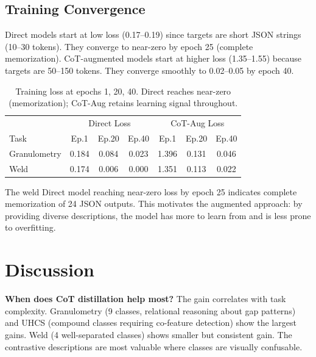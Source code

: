\documentclass[11pt]{article}
\begin{document}
\subsection{Training Convergence}

Direct models start at low loss (0.17--0.19) since targets are short JSON strings (10--30 tokens). They converge to near-zero by epoch 25 (complete memorization). CoT-augmented models start at higher loss (1.35--1.55) because targets are 50--150 tokens. They converge smoothly to 0.02--0.05 by epoch 40.

\begin{table}[h]
\centering\small
\begin{tabular}{l|ccc|ccc}
\toprule
& \multicolumn{3}{c|}{Direct Loss} & \multicolumn{3}{c}{CoT-Aug Loss} \\
Task & Ep.1 & Ep.20 & Ep.40 & Ep.1 & Ep.20 & Ep.40 \\
\midrule
Granulometry & 0.184 & 0.084 & 0.023 & 1.396 & 0.131 & 0.046 \\
Weld & 0.174 & 0.006 & 0.000 & 1.351 & 0.113 & 0.022 \\
\bottomrule
\end{tabular}
\caption{Training loss at epochs 1, 20, 40. Direct reaches near-zero (memorization); CoT-Aug retains learning signal throughout.}
\label{tab:convergence}
\end{table}

The weld Direct model reaching near-zero loss by epoch 25 indicates complete memorization of 24 JSON outputs. This motivates the augmented approach: by providing diverse descriptions, the model has more to learn from and is less prone to overfitting.


\section{Discussion}
\label{sec:discussion}

\textbf{When does CoT distillation help most?} The gain correlates with task complexity. Granulometry (9 classes, relational reasoning about gap patterns) and UHCS (compound classes requiring co-feature detection) show the largest gains. Weld (4 well-separated classes) shows smaller but consistent gain. The contrastive descriptions are most valuable where classes are visually confusable.
\end{document}
